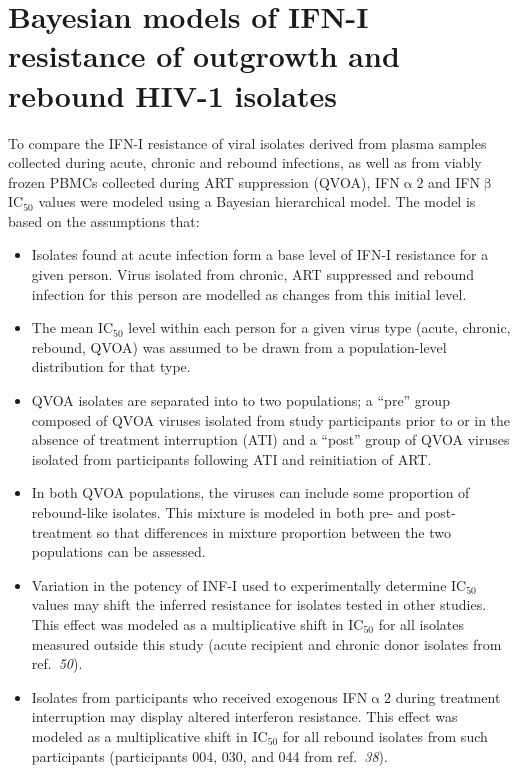 \documentclass[12pt]{article}
\newcommand{\ifna}{IFN\hspace{-.08em}${\upalpha 2}$}
\newcommand{\ifnb}{IFN\hspace{-.03em}${\upbeta}$}
\newcommand{\icFifty}{IC$_{50}$}
\newcommand{\iyerRef}{\textit{50}}
\newcommand{\azzRef}{\textit{38}}
\begin{document}
\section*{Bayesian models of IFN-I resistance of outgrowth and rebound HIV-1 isolates}
  To compare the IFN-I resistance of viral isolates derived from plasma samples collected during acute, chronic and rebound infections, as well as from viably frozen PBMCs collected during ART suppression (QVOA), \ifna{} and \ifnb{} \icFifty{} values were modeled using a Bayesian hierarchical model. The model is based on the assumptions that:
  \begin{itemize}
    \item Isolates found at acute infection form a base level of IFN-I resistance for a given person.  Virus isolated from chronic, ART suppressed and rebound infection for this person are modelled as changes from this initial level.
    \item The mean \icFifty{} level within each person for a given virus type (acute, chronic, rebound, QVOA) was assumed to be drawn from a population-level distribution for that type. 
    \item QVOA isolates are separated into to two populations; a ``pre'' group composed of QVOA viruses isolated from study participants prior to or in the absence of treatment interruption (ATI) and a ``post'' group of QVOA viruses isolated from participants following ATI and reinitiation of ART.
    \item In both QVOA populations, the viruses can include some proportion of rebound-like isolates. This mixture is modeled in both pre- and post-treatment so that differences in mixture proportion between the two populations can be assessed.
    \item Variation in the potency of INF-I used to experimentally determine \icFifty{} values may shift the inferred resistance for isolates tested in other studies. This effect was modeled as a multiplicative shift in \icFifty{} for all isolates measured outside this study (acute recipient and chronic donor isolates from ref.\ \iyerRef{}).
    \item Isolates from participants who received exogenous \ifna{} during treatment interruption may display altered interferon resistance. This effect was modeled as a multiplicative shift in \icFifty{} for all rebound isolates from such participants (participants 004, 030, and 044 from ref.\ \azzRef{}).
  \end{itemize}
\end{document}
